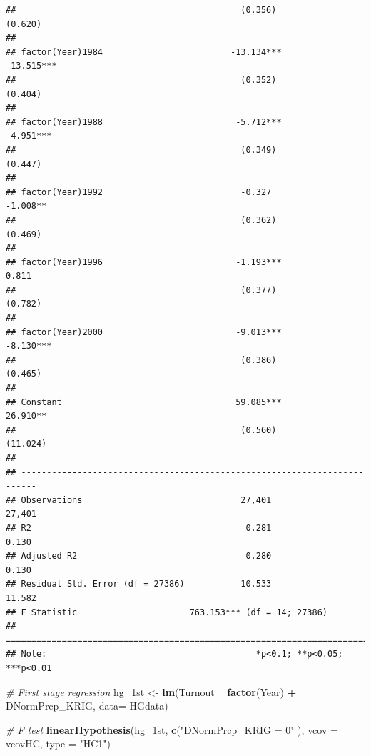 \documentclass[]{book}
\newenvironment{Shaded}{\begin{snugshade}}{\end{snugshade}}
\newcommand{\KeywordTok}[1]{\textcolor[rgb]{0.13,0.29,0.53}{\textbf{#1}}}
\newcommand{\DataTypeTok}[1]{\textcolor[rgb]{0.13,0.29,0.53}{#1}}
\newcommand{\StringTok}[1]{\textcolor[rgb]{0.31,0.60,0.02}{#1}}
\newcommand{\CommentTok}[1]{\textcolor[rgb]{0.56,0.35,0.01}{\textit{#1}}}
\newcommand{\OperatorTok}[1]{\textcolor[rgb]{0.81,0.36,0.00}{\textbf{#1}}}
\newcommand{\NormalTok}[1]{#1}
\begin{document}
\begin{verbatim}
##                                            (0.356)             (0.620)   
##                                                                          
## factor(Year)1984                         -13.134***           -13.515*** 
##                                            (0.352)             (0.404)   
##                                                                          
## factor(Year)1988                          -5.712***           -4.951***  
##                                            (0.349)             (0.447)   
##                                                                          
## factor(Year)1992                           -0.327              -1.008**  
##                                            (0.362)             (0.469)   
##                                                                          
## factor(Year)1996                          -1.193***             0.811    
##                                            (0.377)             (0.782)   
##                                                                          
## factor(Year)2000                          -9.013***           -8.130***  
##                                            (0.386)             (0.465)   
##                                                                          
## Constant                                  59.085***            26.910**  
##                                            (0.560)             (11.024)  
##                                                                          
## -------------------------------------------------------------------------
## Observations                               27,401               27,401   
## R2                                          0.281               0.130    
## Adjusted R2                                 0.280               0.130    
## Residual Std. Error (df = 27386)           10.533               11.582   
## F Statistic                      763.153*** (df = 14; 27386)             
## =========================================================================
## Note:                                         *p<0.1; **p<0.05; ***p<0.01
\end{verbatim}

\begin{Shaded}
\begin{Highlighting}[]
\CommentTok{# First stage regression }
\NormalTok{hg_1st <-}\StringTok{ }\KeywordTok{lm}\NormalTok{(Turnout }\OperatorTok{~}\StringTok{  }\KeywordTok{factor}\NormalTok{(Year) }\OperatorTok{+}\StringTok{ }\NormalTok{DNormPrcp_KRIG, }\DataTypeTok{data=}\NormalTok{ HGdata)}

\CommentTok{# F test}
\KeywordTok{linearHypothesis}\NormalTok{(hg_1st, }
                 \KeywordTok{c}\NormalTok{(}\StringTok{"DNormPrcp_KRIG = 0"}\NormalTok{ ), }
                 \DataTypeTok{vcov =}\NormalTok{ vcovHC, }\DataTypeTok{type =} \StringTok{"HC1"}\NormalTok{)}
\end{Highlighting}
\end{Shaded}
\end{document}
